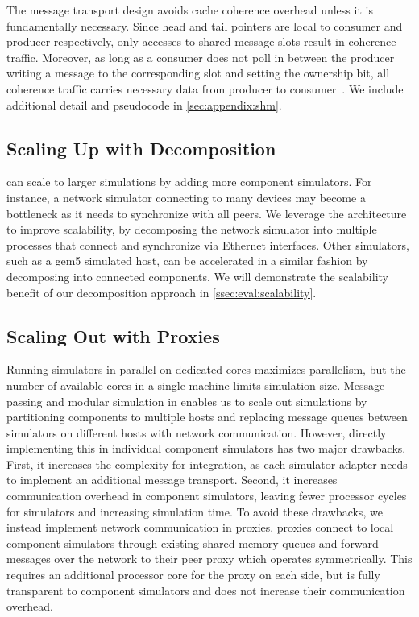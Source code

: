 The \sysname message transport design avoids cache coherence overhead unless it
is fundamentally necessary.
%
Since head and tail pointers are local to consumer and producer
respectively, only accesses to shared message slots result in
coherence traffic.
%
Moreover, as long as a consumer does not poll in between the producer
writing a message to the corresponding slot and setting the ownership
bit, all coherence traffic carries necessary data from producer to
consumer~\cite{baumann:barrelfish}.
We include additional detail and pseudocode in \autoref{sec:appendix:shm}.


\subsection{Scaling Up with Decomposition}
\label{ssec:design:decomp}
\sysname can scale to larger simulations by adding more component simulators.
%
For instance, a network simulator connecting to many devices may become a
bottleneck as it needs to synchronize with all peers.
%
We leverage the \sysname architecture to improve scalability, by
decomposing the network simulator into multiple processes that
connect and synchronize via \sysname Ethernet interfaces.
%
Other simulators, such as a gem5 simulated host, can be accelerated in a similar
fashion by decomposing into connected components.
%
We will demonstrate the scalability benefit of our decomposition approach in
\autoref{ssec:eval:scalability}.


\subsection{Scaling Out with Proxies}
\label{ssec:design:proxy}
Running simulators in parallel on dedicated cores maximizes parallelism, but the
number of available cores in a single machine limits simulation size.
%
Message passing and modular simulation in \sysname enables us to scale out
simulations by partitioning components to multiple hosts and replacing message
queues between simulators on different hosts with network communication.
%
However, directly implementing this in individual component simulators
has two major drawbacks.
%
First, it increases the complexity for integration,
as each simulator adapter needs to implement an additional message
transport.
%
Second, it increases communication overhead in component simulators,
leaving fewer processor cycles for simulators and increasing
simulation time.
%
To avoid these drawbacks, we instead implement network communication
in proxies.
%
\sysname proxies connect to local component simulators through
existing shared memory queues and forward messages over the network to
their peer proxy which operates symmetrically.
%
This requires an additional processor core for the proxy on each side,
but is fully transparent to component simulators and does not increase
their communication overhead.




